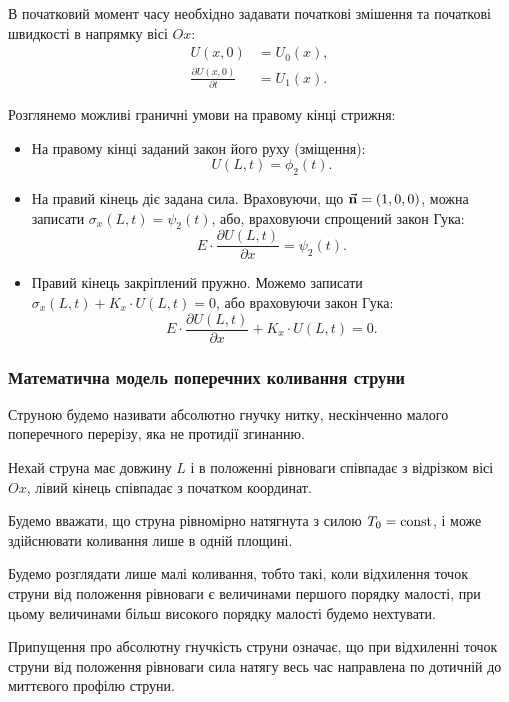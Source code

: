 В початковий момент часу необхідно задавати початкові змішення та початкові швидкості в напрямку вісі $Ox$:
\begin{align}
	U(x, 0) &= U_0(x), \\
	\frac{\partial U(x, 0)}{\partial t} &= U_1(x).
\end{align}

Розглянемо можливі граничні умови на правому кінці стрижня:
\begin{itemize}
	\item На правому кінці заданий закон його руху (зміщення):
	\begin{equation}
		U(L, t) = \phi_2(t).
	\end{equation}
	\item На правий кінець діє задана сила. Враховуючи, що $\vec{\bf{n}} = (1, 0, 0)$, можна записати $\sigma_x(L, t) = \psi_2(t)$, або, враховуючи спрощений закон Гука:
	\begin{equation}
		E \cdot \frac{\partial U(L, t)}{\partial x} = \psi_2(t).
	\end{equation}
	\item  Правий кінець закріплений пружно. Можемо записати $\sigma_x(L, t) + K_x \cdot U(L, t) = 0$, або враховуючи закон Гука:
	\begin{equation}
		E \cdot \frac{\partial U(L, t)}{\partial x} + K_x \cdot U(L, t) = 0.		
	\end{equation}
\end{itemize}

\subsubsection{Математична модель поперечних коливання струни}

Струною будемо називати абсолютно гнучку нитку, нескінченно малого поперечного перерізу, яка не протидії згинанню. \medskip

Нехай струна має довжину $L$ і в положенні рівноваги співпадає з відрізком вісі $Ox$, лівий кінець співпадає з початком координат. \medskip

Будемо вважати, що струна рівномірно натягнута з силою $T_0 = \const$, і може здійснювати коливання лише в одній площині. \medskip

Будемо розглядати лише малі коливання, тобто такі, коли відхилення точок струни від положення рівноваги є величинами першого порядку малості, при цьому величинами більш високого порядку малості будемо нехтувати. \medskip

Припущення про абсолютну гнучкість струни означає, що при відхиленні точок струни від положення рівноваги сила натягу весь час направлена по дотичній до миттєвого профілю струни. \medskip

